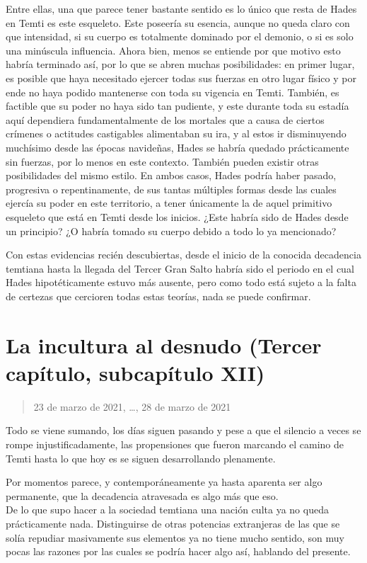 \documentclass[
  spanish,
]{book}
\begin{document}
Entre ellas, una que parece tener bastante sentido es lo único que resta de Hades en Temti es este esqueleto. Este poseería su esencia, aunque no queda claro con que intensidad, si su cuerpo es totalmente dominado por el demonio, o si es solo una minúscula influencia. Ahora bien, menos se entiende por que motivo esto habría terminado así, por lo que se abren muchas posibilidades: en primer lugar, es posible que haya necesitado ejercer todas sus fuerzas en otro lugar físico y por ende no haya podido mantenerse con toda su vigencia en Temti. También, es factible que su poder no haya sido tan pudiente, y este durante toda su estadía aquí dependiera fundamentalmente de los mortales que a causa de ciertos crímenes o actitudes castigables alimentaban su ira, y al estos ir disminuyendo muchísimo desde las épocas navideñas, Hades se habría quedado prácticamente sin fuerzas, por lo menos en este contexto. También pueden existir otras posibilidades del mismo estilo. En ambos casos, Hades podría haber pasado, progresiva o repentinamente, de sus tantas múltiples formas desde las cuales ejercía su poder en este territorio, a tener únicamente la de aquel primitivo esqueleto que está en Temti desde los inicios. ¿Este habría sido de Hades desde un principio? ¿O habría tomado su cuerpo debido a todo lo ya mencionado?

Con estas evidencias recién descubiertas, desde el inicio de la conocida decadencia temtiana hasta la llegada del Tercer Gran Salto habría sido el periodo en el cual Hades hipotéticamente estuvo más ausente, pero como todo está sujeto a la falta de certezas que cercioren todas estas teorías, nada se puede confirmar.

\hypertarget{la-incultura-al-desnudo-tercer-capuxedtulo-subcapuxedtulo-xii}{%
\section{La incultura al desnudo (Tercer capítulo, subcapítulo XII)}\label{la-incultura-al-desnudo-tercer-capuxedtulo-subcapuxedtulo-xii}}

\begin{quote}
23 de marzo de 2021, \ldots, 28 de marzo de 2021
\end{quote}

Todo se viene sumando, los días siguen pasando y pese a que el silencio a veces se rompe injustificadamente, las propensiones que fueron marcando el camino de Temti hasta lo que hoy es se siguen desarrollando plenamente.

Por momentos parece, y contemporáneamente ya hasta aparenta ser algo permanente, que la decadencia atravesada es algo más que eso.\\
De lo que supo hacer a la sociedad temtiana una nación culta ya no queda prácticamente nada. Distinguirse de otras potencias extranjeras de las que se solía repudiar masivamente sus elementos ya no tiene mucho sentido, son muy pocas las razones por las cuales se podría hacer algo así, hablando del presente.
\end{document}
